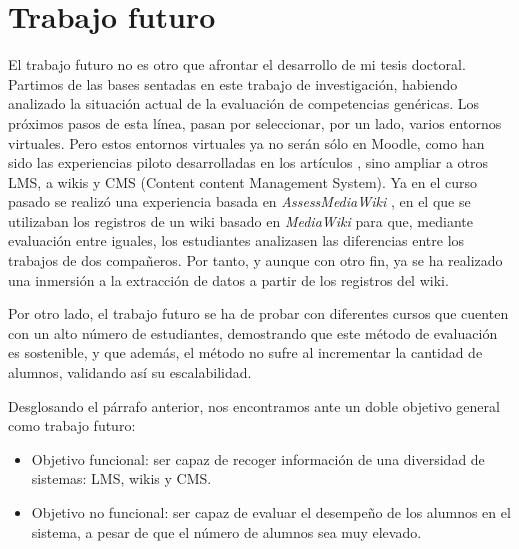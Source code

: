 \section{Trabajo futuro} %
El trabajo futuro no es otro que afrontar el desarrollo de mi tesis doctoral. Partimos de las bases sentadas en este trabajo de investigación, habiendo analizado la situación actual de la evaluación de competencias genéricas. Los próximos pasos de esta línea, pasan por seleccionar, por un lado, varios entornos virtuales. Pero estos entornos virtuales ya no serán sólo en Moodle, como han sido las experiencias piloto desarrolladas en los artículos \cite{Balderas:2013,Balderas:2013a}, sino ampliar a otros LMS, a wikis y CMS (Content content Management System). Ya en el curso pasado se realizó una experiencia basada en \emph{AssessMediaWiki} \cite{Balderas:2012}, en el que se utilizaban los registros de un wiki basado en \emph{MediaWiki} para que, mediante evaluación entre iguales, los estudiantes analizasen las diferencias entre los trabajos de dos compañeros. Por tanto, y aunque con otro fin, ya se ha realizado una inmersión a la extracción de datos a partir de los registros del wiki.

Por otro lado, el trabajo futuro se ha de probar con diferentes cursos que cuenten con un alto número de estudiantes, demostrando que este método de evaluación es sostenible, y que además, el método no sufre al incrementar la cantidad de alumnos, validando así su escalabilidad.

Desglosando el párrafo anterior, nos encontramos ante un doble objetivo general como trabajo futuro:
\begin{itemize}
\item Objetivo funcional: ser capaz de recoger información de una diversidad de sistemas: LMS, wikis y CMS.
\item Objetivo no funcional: ser capaz de evaluar el desempeño de los alumnos en el sistema, a pesar de que el número de alumnos sea muy elevado.
\end{itemize}




